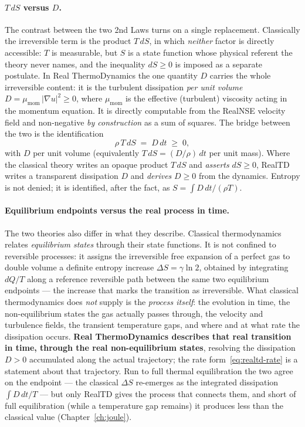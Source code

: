 \paragraph{$T\,dS$ versus $D$.}
The contrast between the two 2nd Laws turns on a single replacement.
Classically the irreversible term is the product $T\,dS$, in which
\emph{neither} factor is directly accessible: $T$ is measurable, but
$S$ is a state function whose physical referent the theory never names,
and the inequality $dS \ge 0$ is imposed as a separate postulate. In
Real ThermoDynamics the one quantity $D$ carries the whole irreversible
content: it is the turbulent dissipation \emph{per unit volume}
$D = \mu_{\mathrm{mom}}\,|\nabla u|^2 \ge 0$, where $\mu_{\mathrm{mom}}$ is the
effective (turbulent) viscosity acting in the momentum equation. It is directly
computable from the RealNSE velocity field and non-negative \emph{by
construction} as a sum of squares. The bridge between the two is the identification
\begin{equation}\label{eq:TdS-eq-D}
\rho\,T\,dS \;=\; D\,dt \;\ge\; 0 ,
\end{equation}
with $D$ per unit volume (equivalently $T\,dS = (D/\rho)\,dt$ per unit mass).
Where the classical theory writes an opaque product $T\,dS$ and
\emph{asserts} $dS \ge 0$, RealTD writes a transparent dissipation $D$
and \emph{derives} $D \ge 0$ from the dynamics. Entropy is not denied;
it is identified, after the fact, as $S = \int D\,dt/(\rho T)$.

\paragraph{Equilibrium endpoints versus the real process in time.}
The two theories also differ in what they describe. Classical thermodynamics
relates \emph{equilibrium states} through their state functions. It is not
confined to reversible processes: it assigns the irreversible free expansion of
a perfect gas to double volume a definite entropy increase $\Delta S = \gamma\ln 2$,
obtained by integrating $dQ/T$ along a reference reversible path between the
same two equilibrium endpoints --- the increase that marks the transition as
irreversible. What classical thermodynamics does \emph{not} supply is the
\emph{process itself}: the evolution in time, the non-equilibrium states the gas
actually passes through, the velocity and turbulence fields, the transient
temperature gaps, and where and at what rate the dissipation occurs.
\textbf{Real ThermoDynamics describes that real transition in time, through the
real non-equilibrium states}, resolving the dissipation $D>0$ accumulated along
the actual trajectory; the rate form~\eqref{eq:realtd-rate} is a statement about
that trajectory. Run to full thermal equilibration the two agree on the endpoint
--- the classical $\Delta S$ re-emerges as the integrated dissipation
$\int D\,dt/T$ --- but only RealTD gives the process that connects them, and short
of full equilibration (while a temperature gap remains) it produces less than the
classical value (Chapter~\ref{ch:joule}).

